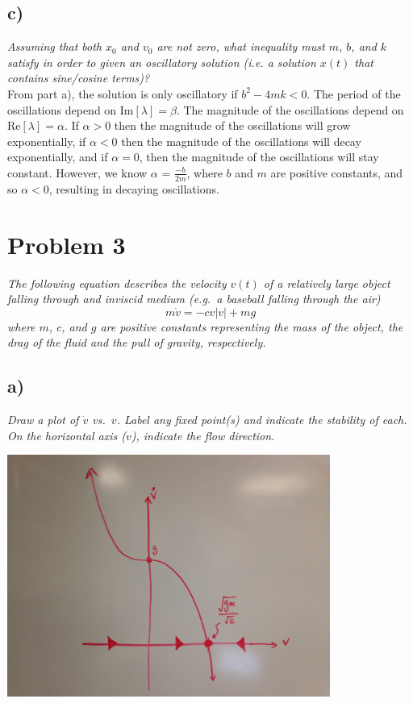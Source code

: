\documentclass[12pt]{article}
\begin{document}
\begin{center}
\end{center}

\subsection*{ c)}
{\it Assuming that both $x_0$ and $v_0$ are not zero, what inequality must $m$, $b$, and $k$ satisfy in order to given an oscillatory solution (i.e. a solution $x(t)$ that contains sine/cosine terms)?} \\

From part a), the solution is only oscillatory if $b^2 - 4mk < 0$.  The period of the oscillations depend on $\text{Im}[\lambda] = \beta$.  The magnitude of the oscillations depend on $\text{Re}[\lambda] = \alpha$.  If $\alpha > 0$ then the magnitude of the oscillations will grow exponentially, if $\alpha < 0$ then the magnitude of the oscillations will decay exponentially, and if $\alpha = 0$, then the magnitude of the oscillations will stay constant.  However, we know $\alpha$ = $\frac{-b}{2m}$, where $b$ and $m$ are positive constants, and so $\alpha < 0$, resulting in decaying oscillations.

\section*{Problem 3}
{\it The following equation describes the velocity $v(t)$ of a relatively large object falling through and inviscid medium (e.g.~a baseball falling through the air)}
\begin{equation}
	\label{change_bead}
	m\dot{v} = -cv|v| + mg
\end{equation}
{\it where $m$, $c$, and $g$ are positive constants representing the mass of the object, the drag of the fluid and the pull of gravity, respectively.}

\subsection*{ a)}
{\it Draw a plot of $\dot{v}$ vs.~$v$.  Label any fixed point(s) and indicate the stability of each.  On the horizontal axis ($v$), indicate the flow direction.}

\begin{center}
	\includegraphics[width=400px]{figures/3_a.jpg}
\end{center}
\end{document}
